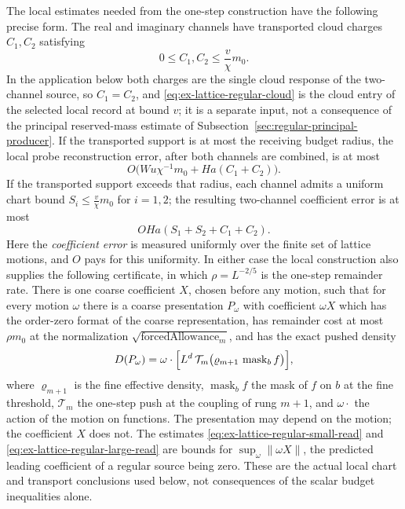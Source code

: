 The local estimates needed from the one-step construction have the following
precise form. The real and imaginary channels have transported cloud
charges \(C_1,C_2\) satisfying
\begin{equation}
 0\leq C_1,C_2\leq \frac{v}{\chi}m_0. \label{eq:ex-lattice-regular-cloud}
\end{equation}
In the application below both charges are the single cloud response of
the two-channel source, so \(C_1=C_2\), and \eqref{eq:ex-lattice-regular-cloud}
is the cloud entry of the selected local record at bound \(v\); it is a
separate input, not a consequence of the principal reserved-mass estimate
of Subsection~\ref{sec:regular-principal-producer}.
If the transported support is at most the receiving budget radius, the
local probe reconstruction error, after both channels are combined, is at
most
\begin{equation}
O\bigl(Wu\chi^{-1}m_0+Ha(C_1+C_2)\bigr). \label{eq:ex-lattice-regular-small-read}
\end{equation}
If the transported support exceeds that radius, each channel admits a
uniform chart bound \(S_i\leq \frac{v}{\chi}m_0\) for \(i=1,2\); the resulting two-channel
coefficient error is at most
\begin{equation}
 OHa(S_1+S_2+C_1+C_2). \label{eq:ex-lattice-regular-large-read}
\end{equation}
Here the \emph{coefficient error} is measured uniformly over the finite
set of lattice motions, and \(O\) pays for this uniformity. In either
case the local construction also supplies the following certificate, in
which \(\rho=L^{-2/5}\) is the one-step remainder rate. There is one
coarse coefficient \(X\), chosen before any motion, such that for every
motion \(\omega\) there is a coarse presentation \(P_\omega\) with
coefficient \(\omega X\) which has the order-zero format of the coarse
representation, has remainder cost at most \(\rho m_0\) at the
normalization \(\sqrt{\operatorname{forcedAllowance}_m}\), and has the
exact pushed density
\begin{equation}
 D(P_\omega)=\omega\cdot\Bigl[L^d\,\mathcal T_m\bigl(
     \varrho_{m+1}\,\operatorname{mask}_b f\bigr)\Bigr],
 \label{eq:ex-lattice-regular-pushed-density}
\end{equation}
where \(\varrho_{m+1}\) is the fine effective density,
\(\operatorname{mask}_bf\) the mask of \(f\) on \(b\) at the fine
threshold, \(\mathcal T_m\) the one-step push at the coupling of rung
\(m+1\), and \(\omega\cdot\) the action of the motion on functions. The
presentation may depend on the motion; the coefficient \(X\) does not.
The estimates \eqref{eq:ex-lattice-regular-small-read} and
\eqref{eq:ex-lattice-regular-large-read} are bounds for
\(\sup_\omega\|\omega X\|\), the predicted leading coefficient of a regular
source being zero. These
are the actual local chart and transport conclusions used below, not
consequences of the scalar budget inequalities alone.

